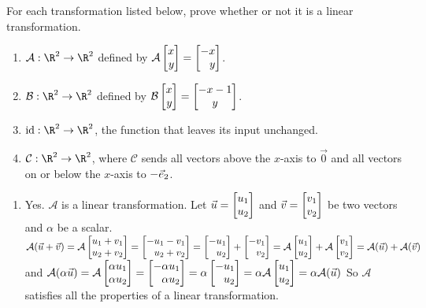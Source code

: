 \begin{exercises}
	\begin{problist}
		\prob For each transformation listed below, prove whether or not it is a
		linear transformation. \label{PROBSETMOD9-linnonlin}
		\begin{enumerate}
			\item $\mathcal{A}:\R^{2}\to\R^{2}$ defined by
				$\mathcal{A}\mat{x\\y}=\mat{-x\\y}$.

			\item $\mathcal{B}:\R^{2}\to\R^{2}$ defined by
				$\mathcal{B}\mat{x\\y}=\matc{-x-1\\y}$.

			\item $\Ident:\R^{2}\to\R^{2}$, the function that leaves its input unchanged.

			\item $\mathcal{C}:\R^{2}\to\R^{2}$, where $\mathcal{C}$ sends all vectors
				above the $x$-axis to $\vec 0$ and all vectors on or below the $x$-axis
				to $-{\vec e_2}$.
		\end{enumerate}
		\begin{solution}
			\begin{enumerate}
				\item Yes. $\mathcal{A}$ is a linear transformation. Let
					$\vec{u}= \mat{u_1\\u_2}$ and $\vec{v}= \mat{v_1 \\ v_2}$ be
					two vectors and $\alpha$ be a scalar. $\mathcal{A}(\vec{u}+
					\vec{v}) = \mathcal{A}\mat{u_1 + v_1 \\ u_2 + v_2}= \mat
					{-u_1 - v_1 \\ u_2 + v_2 }= \mat{-u_1 \\ u_2 }+ \mat
					{ - v_1 \\ v_2 }= \mathcal{A}\mat{u_1\\u_2}+ \mathcal{A}\mat
					{v_1 \\ v_2}= \mathcal{A}(\vec{u}) +\mathcal{A}(\vec{v})$ and
					$\mathcal{A}(\alpha \vec{u}) = \mathcal{A}\mat
					{\alpha u_1 \\ \alpha u_2}= \mat
					{ - \alpha u_1 \\ \alpha u_2}= \alpha \mat{ - u_1 \\u_2}=
					\alpha \mathcal{A}\mat{ u_1 \\u_2}= \alpha \mathcal{A}(\vec
					{u}) $ So $\mathcal{A}$ satisfies all the properties of a linear
					transformation.


\end{enumerate}
\end{solution}
\end{problist}
\end{exercises}

